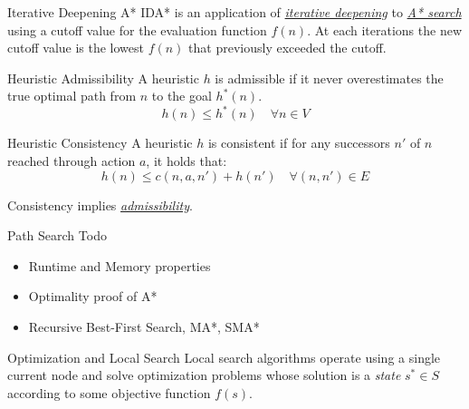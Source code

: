 \documentclass{cognito}
\begin{document}
\begin{note}{Iterative Deepening A*}
	IDA* is an application of \hyperref[note:Iterative Deepening DFS]{\it iterative deepening} to \hyperref[note:A* Search]{\it A* search}
	using a cutoff value
	for the evaluation function $f(n)$. At each iterations the new cutoff
	value is the lowest $f(n)$ that previously exceeded the cutoff.
	
\end{note}


\begin{note}{Heuristic Admissibility} 
	A heuristic $h$ is admissible if it never overestimates the
	true optimal path from $n$ to the goal $h^*(n)$.
	$$ h(n) \leq h^*(n) \quad \forall n \in V$$
	\vspace{-10pt}
\end{note}

\begin{note}{Heuristic Consistency} 
	A heuristic $h$ is consistent if for any successors $n'$ of $n$ reached through action $a$, it holds that: 
	$$ h(n) \leq c(n, a, n') + h(n') \quad \forall (n, n') \in E$$
	\begin{remark} Consistency implies \hyperref[note:Heuristic Admissibility]{\it admissibility}. \end{remark}
	\vspace{-5pt}
\end{note}

\begin{answer}{Path Search Todo}
	\begin{itemize}
		\item Runtime and Memory properties
		\item Optimality proof of A*
		\item Recursive Best-First Search, MA*, SMA*
	\end{itemize}
\end{answer}


\begin{note}{Optimization and Local Search}
	Local search algorithms operate using a single current node and solve
	optimization problems whose solution is a \emph{state} $s^* \in S$ according
	to some objective function $f(s)$.

\end{note}
\end{document}
